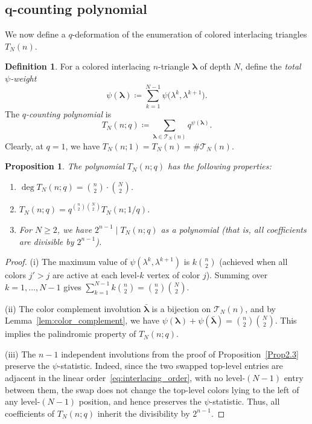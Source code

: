 \documentclass[pdftex]{sigma}
\numberwithin{equation}{section}
\newtheorem{Proposition}[Theorem]{Proposition}
\theoremstyle{definition}
\newtheorem{Definition}[Theorem]{Definition}
\begin{document}
\subsection[q-counting polynomial]{$\boldsymbol{q}$-counting polynomial}
\label{subsec:q_counting_polynomial}

We now define a $q$-deformation of the enumeration of colored interlacing
triangles $T_N(n)$.

\begin{Definition}
	\label{def:q_polynomial} For a colored interlacing $n$-triangle
	$\boldsymbol\lambda$ of depth $N$, define the \emph{total $\psi$-weight}
	\begin{equation*}
		\psi(\boldsymbol\lambda) \coloneqq \sum_{k=1}^{N-1} \psi\bigl(\lambda^k,
		\lambda^{k+1}\bigr).
	\end{equation*}
	The \emph{$q$-counting polynomial} is
	\begin{equation*}
		T_N(n;q) \coloneqq \sum_{\boldsymbol\lambda \in \mathcal{T}_N(n)}
		q^{\psi(\boldsymbol\lambda)}.
	\end{equation*}
	Clearly, at $q=1$, we have $T_N(n;1) = T_N(n) = \#\mathcal{T}_N(n)$.
\end{Definition}

\begin{Proposition}
	\label{prop:q_polynomial_properties} The polynomial $T_N(n;q)$ has the
	following properties:
	\begin{enumerate}[\rm (i)]\itemsep=0pt
		\item $\deg T_N(n;q) = \binom{n}{2} \cdot \binom{N}{2}$.
		\item $T_N(n;q) = q^{\binom{n}{2}\binom{N}{2}} T_N(n;1/q)$.
		\item For $N\ge2$, we have $2^{n-1} \mid T_N(n;q)$ as a polynomial
		(that is, all coefficients are divisible by $2^{n-1}$).
	\end{enumerate}
\end{Proposition}
\begin{proof}
(i) The maximum value of $\psi(\lambda^k, \lambda^{k+1})$ is $k\binom{n}{2}$
		(achieved when all colors $j' > j$ are active at each level-$k$ vertex
		of color $j$).
		Summing over $k=1,\dots,N-1$ gives
		$\sum_{k=1}^{N-1} k\binom{n}{2} = \binom{n}{2}\binom{N}{2}$.

(ii) The color complement involution $\bar{\boldsymbol\lambda}$
		is a bijection on $\mathcal{T}_N(n)$, and by
		Lemma~\ref{lem:color_complement}, we have
		$\psi(\boldsymbol\lambda) + \psi(\bar{\boldsymbol\lambda}) = \binom{n}{2}\binom{N}{2}$.
		This implies the palindromic property of $T_N(n;q)$.

(iii)
The $n-1$
independent involutions from the proof of Proposition~\ref{Prop2.3} preserve
the $\psi$-statistic. Indeed, since the two swapped top-level
entries are adjacent in the linear order~\eqref{eq:interlacing_order}, with no
level-$(N-1)$ entry between them, the swap does not change the
top-level colors lying to the left of any level-$(N-1)$ position,
and hence preserves the $\psi$-statistic.
Thus, all coefficients of $T_N(n;q)$ inherit the divisibility by
		$2^{n-1}$.
\end{proof}
\end{document}
